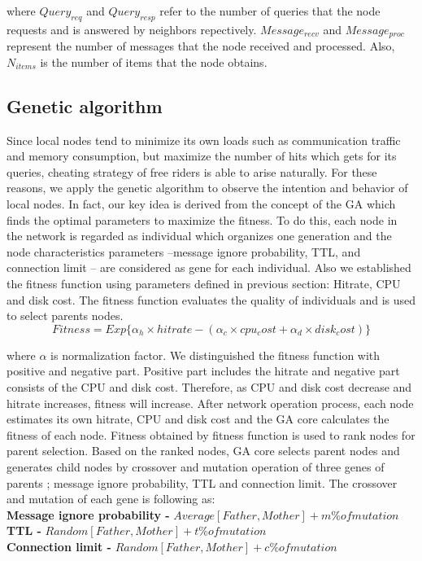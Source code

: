 \documentclass[12pt,journal,draftcls,letterpaper,onecolumn]{IEEEtran}
\begin{document}
where $Query_{req}$ and $Query_{resp}$ refer to the number of queries that the node requests and is answered by neighbors repectively. $Message_{recv}$ and $Message_{proc}$ represent the number of messages that the node received and processed. Also, $N_{items}$ is the number of items that the node obtains.

\subsection{Genetic algorithm}\label{sec:genetic}
Since local nodes tend to minimize its own loads such as communication traffic and memory
consumption, but maximize the number of hits which gets for its queries, cheating strategy of
free riders is able to arise naturally. For these reasons, we apply the genetic algorithm to
observe the intention and behavior of local nodes. In fact, our key idea is derived from the
concept of the GA which finds the optimal parameters to maximize the fitness. To do this,
each node in the network is regarded as individual which organizes one generation and the
node characteristics parameters –message ignore probability, TTL, and connection limit – are
considered as gene for each individual.
Also we established the fitness function using parameters defined in previous section: Hitrate,
CPU and disk cost. The fitness function evaluates the quality of individuals and is used to
select parents nodes.
\[
Fitness = Exp\{\alpha_{h}\times hitrate-(\alpha_{c}\times cpu_cost + \alpha_{d}\times disk_cost)\}
\]

where $\alpha$ is normalization factor. We distinguished the fitness function with positive and
negative part. Positive part includes the hitrate and negative part consists of the CPU and disk
cost. Therefore, as CPU and disk cost decrease and hitrate increases, fitness will increase.
After network operation process, each node estimates its own hitrate, CPU and disk cost and
the GA core calculates the fitness of each node. Fitness obtained by fitness function is used to
rank nodes for parent selection. Based on the ranked nodes, GA core selects parent nodes and
generates child nodes by crossover and mutation operation of three genes of parents ;
message ignore probability, TTL and connection limit. The crossover and mutation of each
gene is following as:\\

{\bf Message ignore probability -}
$Average[Father, Mother] + m\% of mutation$\\
{\bf TTL -}
$Random[Father, Mother] + t\% of mutation$\\
{\bf Connection limit -}
$Random[Father, Mother] + c\% of mutation$\\
\end{document}
